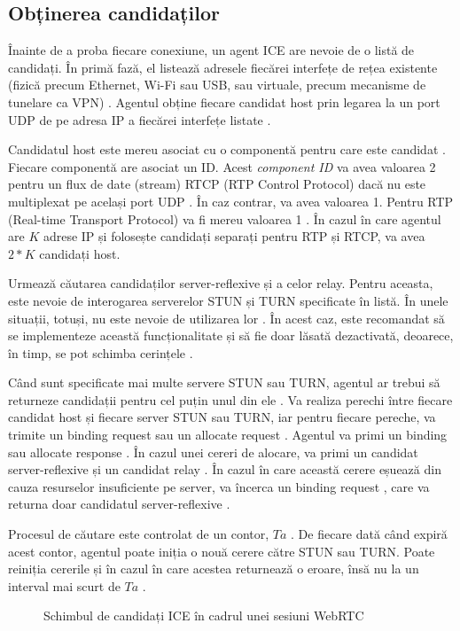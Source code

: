 \subsection{Obținerea candidaților}
\indent \par Înainte de a proba fiecare conexiune, un agent ICE are nevoie de o listă de candidați. În primă fază, el listează adresele fiecărei interfețe de rețea existente (fizică precum Ethernet, Wi-Fi sau USB, sau virtuale, precum mecanisme de tunelare ca VPN) \cite{rfc8445}. Agentul obține fiecare candidat host prin legarea la un port UDP de pe adresa IP a fiecărei interfețe listate \cite{rfc8445}. 
\indent \par Candidatul host este mereu asociat cu o componentă pentru care este candidat \cite{rfc8445}. Fiecare componentă are asociat un ID. Acest \textit{component ID} va avea valoarea 2 pentru un flux de date (stream) RTCP (RTP Control Protocol) dacă nu este multiplexat pe același port UDP \cite{rfc8445}. În caz contrar, va avea valoarea 1. Pentru RTP (Real-time Transport Protocol) va fi mereu valoarea 1 \cite{rfc8445}. În cazul în care agentul are \(K\) adrese IP și folosește candidați separați pentru RTP și RTCP, va avea \(2*K\) candidați host.
\indent \par Urmează căutarea candidaților server-reflexive și a celor relay. Pentru aceasta, este nevoie de interogarea serverelor STUN și TURN specificate în listă. În unele situații, totuși, nu este nevoie de utilizarea lor \cite{rfc8445}. În acest caz, este recomandat să se implementeze această funcționalitate și să fie doar lăsată dezactivată, deoarece, în timp, se pot schimba cerințele \cite{rfc8445}. 
\indent \par Când sunt specificate mai multe servere STUN sau TURN, agentul ar trebui să returneze candidații pentru cel puțin unul din ele \cite{rfc8445}. Va realiza perechi între fiecare candidat host și fiecare server STUN sau TURN, iar pentru fiecare pereche, va trimite un binding request sau un allocate request \cite{rfc8445}. Agentul va primi un binding sau allocate response \cite{rfc8445}. În cazul unei cereri de alocare, va primi un candidat server-reflexive și un candidat relay \cite{rfc8445}. În cazul în care această cerere eșuează din cauza resurselor insuficiente pe server, va încerca un binding request , care va returna doar candidatul server-reflexive \cite{rfc8445}.
\indent \par Procesul de căutare este controlat de un contor, \(Ta\) \cite{rfc8445}. De fiecare dată când expiră acest contor, agentul poate iniția o nouă cerere către STUN sau TURN. Poate reiniția cererile și în cazul în care acestea returnează o eroare, însă nu la un interval mai scurt de \(Ta\) \cite{rfc8445}. 
\begin{figure}
    \centering
    \scalebox{0.75}{}
    \caption{Schimbul de candidați ICE în cadrul unei sesiuni WebRTC}
\end{figure}
